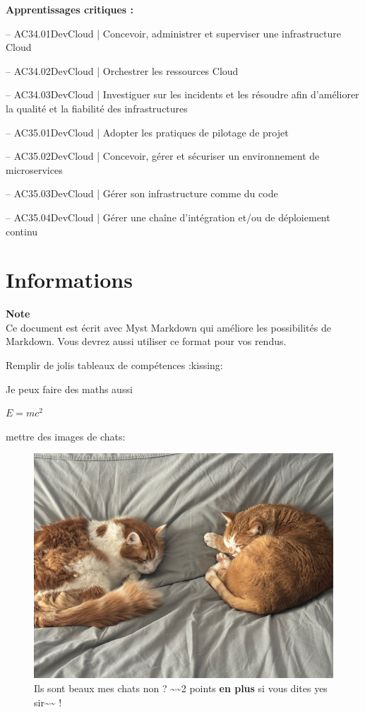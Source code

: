 \documentclass{article}
\begin{document}
\textbf{Apprentissages critiques :}

-- AC34.01DevCloud | Concevoir, administrer et superviser une infrastructure Cloud

-- AC34.02DevCloud | Orchestrer les ressources Cloud

-- AC34.03DevCloud | Investiguer sur les incidents et les résoudre afin d'améliorer la qualité et la fiabilité des infrastructures

-- AC35.01DevCloud | Adopter les pratiques de pilotage de projet

-- AC35.02DevCloud | Concevoir, gérer et sécuriser un environnement de microservices

-- AC35.03DevCloud | Gérer son infrastructure comme du code

-- AC35.04DevCloud | Gérer une chaîne d'intégration et/ou de déploiement continu

\section{Informations}

\begin{framed}
\textbf{Note}\\
Ce document est écrit avec Myst Markdown qui améliore les possibilités de Markdown. Vous devrez aussi utiliser ce format pour vos rendus.
\end{framed}

Remplir de jolis tableaux de compétences :kissing:

Je peux faire des maths aussi

$E=mc^2$

mettre des images de chats:

\begin{figure}[!htbp]
\centering
\includegraphics[width=0.625\linewidth]{files/chats-00ce8bd69eb8aebbc2204cc6d332458f.jpg}
\caption*{Ils sont beaux mes chats non ? {\textasciitilde}{\textasciitilde}2 points \textbf{en plus} si vous dites yes sir{\textasciitilde}{\textasciitilde} !}
\end{figure}
\end{document}
